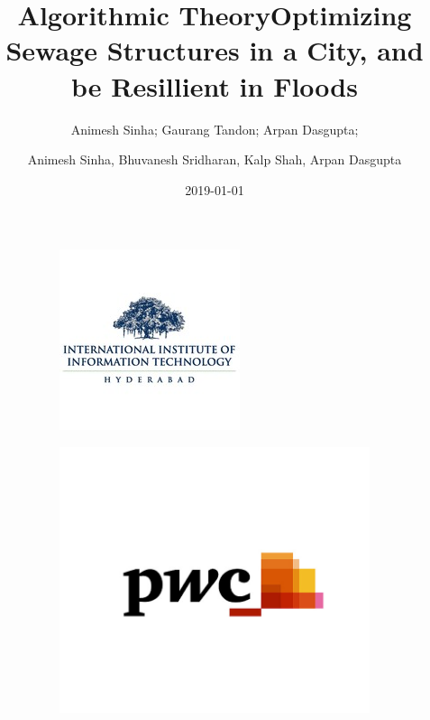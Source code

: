 \documentclass{article}
\title{Algorithmic Theory}
\date{2019-01-01}
\author{Animesh Sinha; Gaurang Tandon; Arpan Dasgupta; }
\title{Optimizing Sewage Structures in a City, and be Resillient in Floods}
\author{Animesh Sinha, Bhuvanesh Sridharan, Kalp Shah, Arpan Dasgupta}
\begin{document}

\maketitle

\begin{figure}[H]
    \centering
    \begin{subfigure}[b]{0.2\textwidth}
        \includegraphics[width=\linewidth]{img-iiit-logo.jpeg}
    \end{subfigure}
    \begin{subfigure}[b]{0.25\textwidth}
        \includegraphics[width=\linewidth]{img-pwc-logo.jpg}
    \end{subfigure}
\end{figure}
\end{document}
